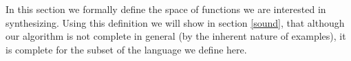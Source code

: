 In this section we formally define the space of functions we are interested in synthesizing. Using this definition we will show in section \ref{sound}, that although our algorithm is not complete in general (by the inherent nature of examples), it is complete for the subset of the language we define here.